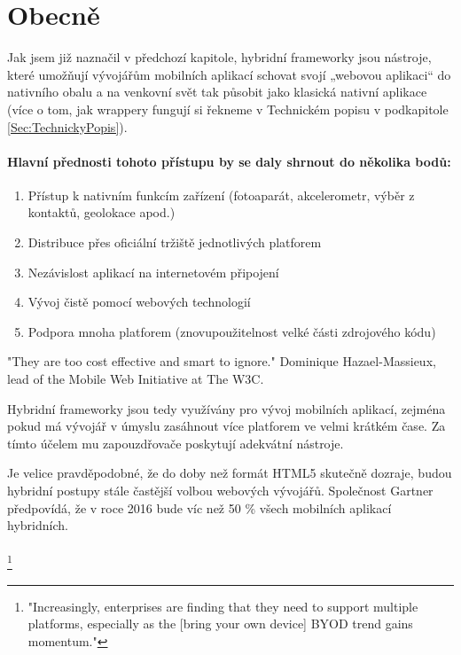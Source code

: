 \section{Obecně}
Jak jsem již naznačil v předchozí kapitole, hybridní frameworky jsou nástroje, které umožňují vývojářům mobilních aplikací schovat svojí „webovou aplikaci“ do nativního obalu a na venkovní svět tak působit jako klasická nativní aplikace (více o tom, jak wrappery fungují si řekneme v Technickém popisu v podkapitole \ref{Sec:TechnickyPopis}).

\paragraph{Hlavní přednosti tohoto přístupu by se daly shrnout do několika bodů:}
\begin{enumerate}
        \item Přístup k nativním funkcím zařízení (fotoaparát, akcelerometr, výběr z kontaktů, geolokace apod.)
        \item Distribuce přes oficiální tržiště jednotlivých platforem
        \item Nezávislost aplikací na internetovém připojení
        \item Vývoj čistě pomocí webových technologií
        \item Podpora mnoha platforem (znovupoužitelnost velké části zdrojového kódu)
\end{enumerate}

"They are too cost effective and smart to ignore." Dominique Hazael-Massieux, lead of the Mobile Web Initiative at The W3C. \cite{bii_hybrid_apps_report}

Hybridní frameworky jsou tedy využívány pro vývoj mobilních aplikací, zejména pokud má vývojář v úmyslu zasáhnout více platforem ve velmi krátkém čase. Za tímto účelem mu zapouzdřovače poskytují adekvátní nástroje.

Je velice pravděpodobné, že do doby než formát HTML5 skutečně dozraje, budou hybridní postupy stále častější volbou webových vývojářů. Společnost Gartner předpovídá, že v roce 2016 bude víc než 50 \% všech mobilních aplikací hybridních. \cite{gartner_says_50}
\\ \\
\textit{\cite{gartner_says_50}}
\footnote{"Increasingly, enterprises are finding that they need to support multiple platforms, especially as the [bring your own device] BYOD trend gains momentum."\cite{gartner_says_50}}\\


